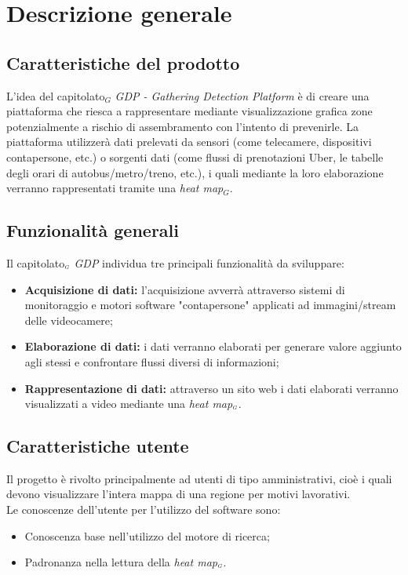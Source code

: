 \chapter{Descrizione generale}\label{descrizioneGenerale}
\section{Caratteristiche del prodotto}\label{descrizioneGeneraleCaratteristicheProdotto}
L'idea del capitolato$_G$ \textit{GDP - Gathering Detection Platform} è di creare una piattaforma che riesca a rappresentare mediante visualizzazione grafica zone potenzialmente a rischio di assembramento con l'intento di prevenirle.
La piattaforma utilizzerà dati prelevati da sensori (come telecamere, dispositivi contapersone, etc.) o sorgenti dati (come flussi di prenotazioni Uber, le tabelle degli orari di autobus/metro/treno, etc.), i quali mediante la loro elaborazione verranno rappresentati tramite una \textit{heat map$_G$}.

\section{Funzionalità generali}\label{descrizioneGeneraleFunzionalitàGenerali}
Il capitolato$_{\scaleto{G}{3pt}}$ \textit{GDP} individua tre principali funzionalità da sviluppare:
\begin{itemize}
	\item \textbf{Acquisizione di dati:} l'acquisizione avverrà attraverso sistemi di monitoraggio e motori software "contapersone" applicati ad immagini/stream delle videocamere;
	\item \textbf{Elaborazione di dati:} i dati verranno elaborati per generare valore aggiunto agli stessi e confrontare flussi diversi di informazioni;
	\item \textbf{Rappresentazione di dati:} attraverso un sito web i dati elaborati verranno visualizzati a video mediante una \textit{heat map$_{\scaleto{G}{3pt}}$}.
\end{itemize}

\section{Caratteristiche utente}\label{descrizioneGeneraleCaratteristicheUtente}
Il progetto è rivolto principalmente ad utenti di tipo amministrativi, cioè i quali devono visualizzare l'intera mappa di una regione per motivi lavorativi. \\
Le conoscenze dell'utente per l'utilizzo del software sono:
\begin{itemize}
	\item Conoscenza base nell'utilizzo del motore di ricerca;
	\item Padronanza nella lettura della \textit{heat map$_{\scaleto{G}{3pt}}$}.
\end{itemize}	


